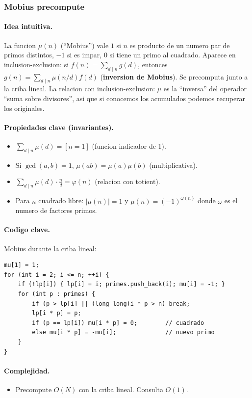 ﻿\subsubsection{Mobius precompute}

\paragraph{Idea intuitiva.}
La funcion $\mu(n)$ (``Mobius'') vale $1$ si $n$ es producto de un numero par de primos distintos, $-1$ si es impar, $0$ si tiene un primo al cuadrado. Aparece en inclusion-exclusion: si $f(n) = \sum_{d \mid n} g(d)$, entonces $g(n) = \sum_{d \mid n} \mu(n/d) f(d)$ (\textbf{inversion de Mobius}). Se precomputa junto a la criba lineal. La relacion con inclusion-exclusion: $\mu$ es la ``inversa'' del operador ``suma sobre divisores'', asi que si conocemos los acumulados podemos recuperar los originales.

\paragraph{Propiedades clave (invariantes).}
\begin{itemize}\setlength\itemsep{0pt}
	\item $\sum_{d \mid n} \mu(d) = [n = 1]$ (funcion indicador de 1).
	\item Si $\gcd(a, b) = 1$, $\mu(ab) = \mu(a) \mu(b)$ (multiplicativa).
	\item $\sum_{d \mid n} \mu(d) \cdot \frac{n}{d} = \varphi(n)$ (relacion con totient).
	\item Para $n$ cuadrado libre: $|\mu(n)| = 1$ y $\mu(n) = (-1)^{\omega(n)}$ donde $\omega$ es el numero de factores primos.
\end{itemize}

\paragraph{Codigo clave.}
Mobius durante la criba lineal:
\begin{verbatim}
mu[1] = 1;
for (int i = 2; i <= n; ++i) {
    if (!lp[i]) { lp[i] = i; primes.push_back(i); mu[i] = -1; }
    for (int p : primes) {
        if (p > lp[i] || (long long)i * p > n) break;
        lp[i * p] = p;
        if (p == lp[i]) mu[i * p] = 0;        // cuadrado
        else mu[i * p] = -mu[i];              // nuevo primo
    }
}
\end{verbatim}

\paragraph{Complejidad.}
\begin{itemize}\setlength\itemsep{0pt}
	\item Precompute $O(N)$ con la criba lineal. Consulta $O(1)$.
\end{itemize}

